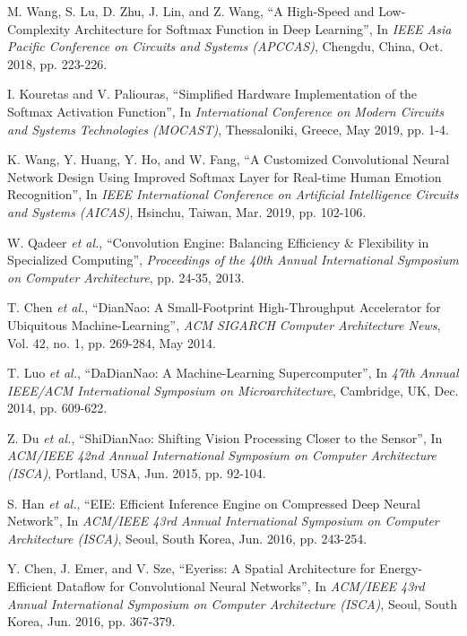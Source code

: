 \documentclass[journal]{IEEEtran}
\begin{document}
\begin{thebibliography}{9}
M. Wang, S. Lu, D. Zhu, J. Lin, and Z. Wang, ``A High-Speed and Low-Complexity Architecture for Softmax Function in Deep Learning'', In \textit{IEEE Asia Pacific Conference on Circuits and Systems (APCCAS)}, Chengdu, China, Oct. 2018, pp. 223-226.

I. Kouretas and V. Paliouras, ``Simplified Hardware Implementation of the Softmax Activation Function'', In \textit{International Conference on Modern Circuits and Systems Technologies (MOCAST)}, Thessaloniki, Greece, May 2019, pp. 1-4.


K. Wang, Y. Huang, Y. Ho, and W. Fang, ``A Customized Convolutional Neural Network Design Using Improved Softmax Layer for Real-time Human Emotion Recognition'', In \textit{IEEE International Conference on Artificial Intelligence Circuits and Systems (AICAS)}, Hsinchu, Taiwan, Mar. 2019, pp. 102-106.

W. Qadeer \textit{et al.}, ``Convolution Engine: Balancing Efficiency \& Flexibility in Specialized Computing'', \textit{Proceedings of the 40th Annual International Symposium on Computer Architecture}, pp. 24-35, 2013.

T. Chen \textit{et al.}, ``DianNao: A Small-Footprint High-Throughput Accelerator for Ubiquitous Machine-Learning'', \textit{ACM SIGARCH Computer Architecture News}, Vol. 42, no. 1, pp. 269-284, May 2014.

T. Luo \textit{et al.}, ``DaDianNao: A Machine-Learning Supercomputer'', In \textit{47th Annual IEEE/ACM International Symposium on Microarchitecture}, Cambridge, UK, Dec. 2014, pp. 609-622.

Z. Du \textit{et al.}, ``ShiDianNao: Shifting Vision Processing Closer to the Sensor'', In \textit{ACM/IEEE 42nd Annual International Symposium on Computer Architecture (ISCA)}, Portland, USA, Jun. 2015, pp. 92-104.

S. Han \textit{et al.}, ``EIE: Efficient Inference Engine on Compressed Deep Neural Network'', In \textit{ACM/IEEE 43rd Annual International Symposium on Computer Architecture (ISCA)}, Seoul, South Korea, Jun. 2016, pp. 243-254.

Y. Chen, J. Emer, and V. Sze, ``Eyeriss: A Spatial Architecture for Energy-Efficient Dataflow for Convolutional Neural Networks'', In \textit{ACM/IEEE 43rd Annual International Symposium on Computer Architecture (ISCA)}, Seoul, South Korea, Jun. 2016, pp. 367-379.


\end{thebibliography}
\end{document}
